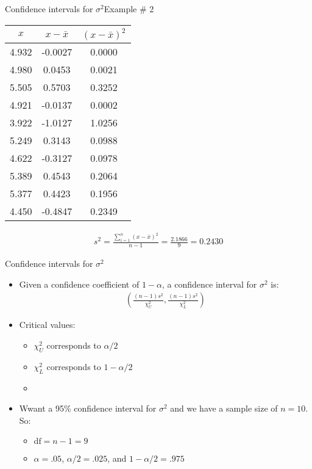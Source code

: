 \documentclass[xcolor=dvipsnames]{beamer}
\begin{document}
\begin{frame}{Confidence intervals for $\sigma^2$}{Example \# 2}
	\begin{center}
			\begin{tabular}{|c|c|c|}
			\hline
			$x$  &   $x-\bar{x}$ & $(x-\bar{x})^2$ \\ \hline \hline
			4.932 & -0.0027& 0.0000 \\ \hline
			4.980&  0.0453& 0.0021 \\ \hline
			5.505&  0.5703& 0.3252 \\ \hline
			4.921& -0.0137& 0.0002 \\ \hline
			3.922& -1.0127& 1.0256 \\ \hline
			5.249&  0.3143& 0.0988 \\ \hline
			4.622& -0.3127& 0.0978 \\ \hline
			5.389&  0.4543& 0.2064 \\ \hline
			5.377&  0.4423& 0.1956 \\ \hline
			4.450& -0.4847& 0.2349 \\ \hline
		\end{tabular}
	\end{center}
	\begin{gather*}
		s^2 = \frac{\sum_{i=1}^n (x-\bar{x})^2}{n-1} =\frac{2.1866}{9} =  0.2430
	\end{gather*}
\end{frame}

\begin{frame}{Confidence intervals for $\sigma^2$}
	\begin{itemize}
		\item Given a confidence coefficient of $1-\alpha$, a confidence interval for $\sigma^2$ is:
		\begin{gather*}
		\left(\frac{(n-1) s^2}{\chi_U^2}, \frac{(n-1)s^2}{\chi_L^2} \right)
		\end{gather*}
		\item Critical values:
		\begin{itemize}
			\item $\chi^2_U$ corresponds to $\alpha / 2$
			\item $\chi^2_L$ corresponds to $1 - \alpha / 2$
			\item[]
		\end{itemize}
		\item Wwant a 95\% confidence interval for $\sigma^2$ and we have a sample size of $n = 10$. So:
		\begin{itemize}
			\item  $\text{df} = n-1 = 9$
			\item $\alpha = .05$, $\alpha / 2 = .025$, and $1-\alpha / 2 = .975$
		\end{itemize}
	\end{itemize}
\end{frame}
\end{document}

